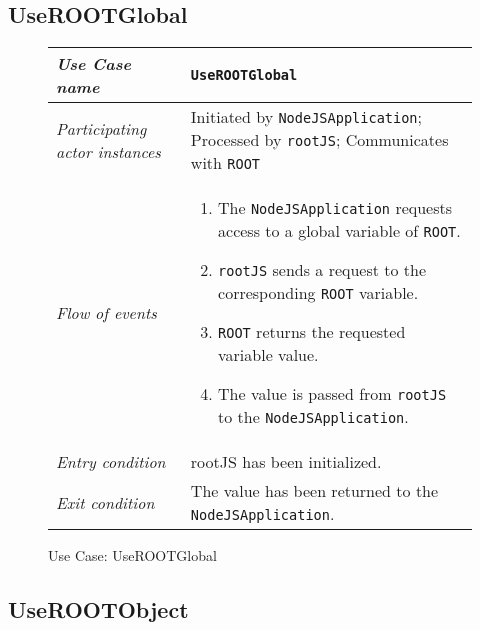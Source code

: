 \subsection{UseROOTGlobal}

\begin{figure}[htb]
	\centering
	\begin{longtable}{p{3cm} @{\hskip 1cm} p{12cm}}
		\hline
		
		\textit{Use Case name} & \texttt{UseROOTGlobal}\\
		\hline
		
		\textit{Participating actor instances} & Initiated by \texttt{NodeJSApplication}; Processed by \texttt{rootJS}; Communicates with \texttt{ROOT}\\
		\hline
		
		\textit{Flow of events} &
			\begin{enumerate}
				\item The \texttt{NodeJSApplication} requests access to a global variable of \texttt{ROOT}.
			
				\item \texttt{rootJS} sends a request to the corresponding \texttt{ROOT} variable.
			
				\item \texttt{ROOT} returns the requested variable value.
	          
	            \item The value is passed from \texttt{rootJS} to the \texttt{NodeJSApplication}.
			\end{enumerate}
			\\
		\hline
		
		\textit{Entry condition} & {rootJS} has been initialized.\\
		\hline
		
		\textit{Exit condition} & The value has been returned to the \texttt{NodeJSApplication}.\\
        \hline
	\end{longtable}
	
	\caption{Use Case: UseROOTGlobal}
\end{figure}

\pagebreak

\subsection{UseROOTObject}

